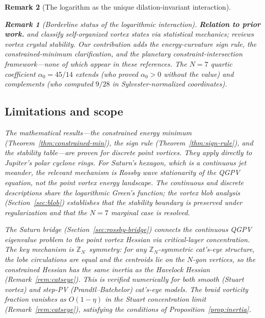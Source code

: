 \documentclass[12pt, a4paper]{article}
\newtheorem{remark}{Remark}[section]
\numberwithin{equation}{section}
\begin{document}
\begin{remark}[The logarithm as the unique dilation-invariant interaction]
\begin{remark}[Borderline status of the logarithmic interaction]
\smallskip\noindent\textbf{Relation to prior work.}
\citet{BouchetVenaille2012} and \citet{ChavanisSommeria1996} classify
self-organized vortex states via statistical mechanics;
\citet{Aref2003} reviews vortex crystal stability.
Our contribution adds the energy-curvature sign rule, the
constrained-minimum clarification, and the planetary
constraint-intersection framework---none of which appear in
these references.  The $N = 7$ quartic coefficient $\alpha_0 = 45/14$
extends \citet{KurakinYudovich2002} (who proved $\alpha_0 > 0$
without the value) and complements \citet{Schmidt2004} (who computed
$9/28$ in Sylvester-normalized coordinates).


\subsection{Limitations and scope}

The mathematical results---the constrained energy minimum
(Theorem~\ref{thm:constrained-min}), the sign rule
(Theorem~\ref{thm:sign-rule}), and the stability table---are proven
for discrete point vortices.  They apply directly to Jupiter's polar
cyclone rings.  For Saturn's hexagon, which is a continuous jet meander,
the relevant mechanism is Rossby wave stationarity of the QGPV
equation, not the point vortex energy landscape.  The continuous and
discrete descriptions share the logarithmic Green's function; the
vortex blob analysis (Section~\ref{sec:blob}) establishes that the
stability boundary is preserved under regularization and that the
$N = 7$ marginal case is resolved.

The Saturn bridge (Section~\ref{sec:rossby-bridge}) connects the
continuous QGPV eigenvalue problem to the point vortex Hessian via
critical-layer concentration.  The key mechanism is
$\mathbb{Z}_N$~symmetry: for any $\mathbb{Z}_N$-symmetric cat's-eye
structure, the lobe circulations are equal and the centroids lie on
the $N$-gon vertices, so the constrained Hessian has the same inertia
as the Havelock Hessian (Remark~\ref{rem:catseye}).  This is verified
numerically for both smooth (Stuart vortex) and step-PV
(Prandtl--Batchelor) cat's-eye models.  The braid vorticity fraction
vanishes as $O(1{-}\eta)$ in the Stuart concentration limit
(Remark~\ref{rem:catseye}), satisfying the conditions of
Proposition~\ref{prop:inertia}.


\end{remark}
\end{remark}
\end{document}
